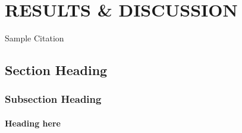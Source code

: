 \chapter{RESULTS \& DISCUSSION}



\hspace{2em} \blindtext %
 Sample Citation \cite{2,5}
 
\section{Section Heading}

\hspace{2em} \blindtext  %


\subsection{Subsection Heading}
\hspace{2em} \blindtext %

\subsubsection{Heading here}
\hspace{2em} \blindtext %

